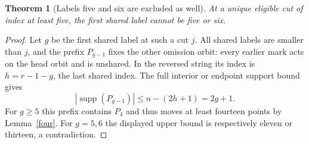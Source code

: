 \documentclass[11pt,a4paper]{article}
\newtheorem{theorem}[lemma]{Theorem}
\begin{document}
\begin{theorem}[Labels five and six are excluded as well]\label{next}
At a unique eligible cut of index at least five, the first shared
label cannot be five or six.
\end{theorem}
\begin{proof}
Let $g$ be the first shared label at such a cut $j$.
All shared labels are smaller than $j$, and the prefix $P_{g-1}$
fixes the other omission orbit: every earlier mark acts on the
head orbit and is unshared. In the reversed string its index
is $h=r-1-g$, the last shared index. The full interior or endpoint
support bound gives
\[
 |\operatorname{supp}(P_{g-1})|\leq
                   n-(2h+1)=2g+1.
\]
For $g\geq5$ this prefix contains $P_4$ and thus moves at least
fourteen points by Lemma~\ref{four}. For $g=5,6$ the displayed
upper bound is respectively eleven or thirteen, a contradiction.
\end{proof}
\end{document}
